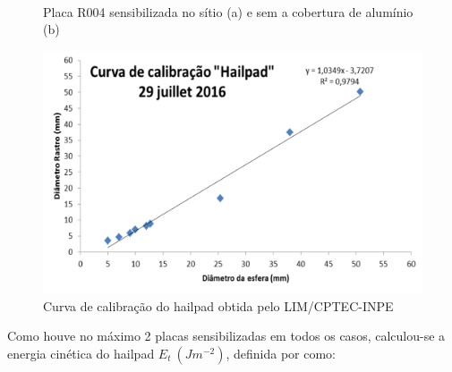 \begin{figure}[htb]
	\begin{center}
		\caption{Placa R004 sensibilizada no sítio (a) e sem a cobertura de alumínio (b)} 
		\label{hailpad_exemplo}
		\quad
		\\
	\end{center}
\end{figure}

\begin{figure}[htb]
	\begin{center}
		\caption{Curva de calibração do hailpad obtida pelo LIM/CPTEC-INPE} 
		\label{calibracao_hailpad}
		\includegraphics[width=0.7\columnwidth]{figs/calibracao_hailpad.png}
	\end{center}
\end{figure}

Como houve no máximo 2 placas sensibilizadas em todos os casos, calculou-se a energia cinética do hailpad $E_t\:(Jm^{-2})$, definida por  como:

